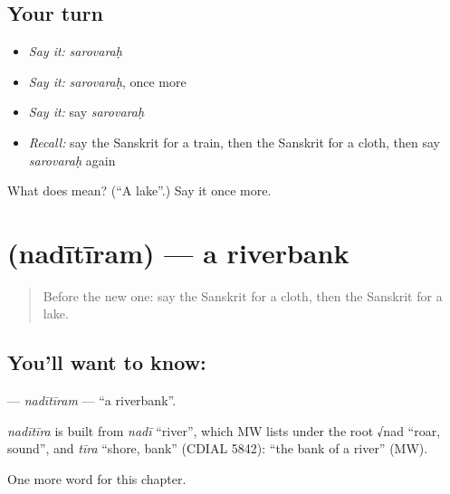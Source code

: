 \subsection*{Your turn}
\begin{itemize}
\raggedright
  \item \emph{Say it:} \emph{sarovaraḥ}
  \item \emph{Say it:} \emph{sarovaraḥ}, once more
  \item \emph{Say it:} say \emph{sarovaraḥ}
  \item \emph{Recall:} say the Sanskrit for a train, then the Sanskrit for a cloth, then say \emph{sarovaraḥ} again
\end{itemize}

\begin{tcolorbox}[breakable,colback=teal!4,colframe=teal!35!black,title={Before you move on}]
What does  mean? (\textquotedblleft{}A lake\textquotedblright{}.) Say it once more.
\end{tcolorbox}
\section[\texorpdfstring{\sk{नदीतीरम्} (nadītīram)}{नदीतीरम् (nadītīram)}]{ (nadītīram) — a riverbank}

\label{lesson:SA-C124-naditiram}



\begin{quote}
Before the new one: say the Sanskrit for a cloth, then the Sanskrit for a lake.
\end{quote}

\subsection*{You'll want to know: }
\textbf{} — \emph{nadītīram} — \textquotedblleft{}a riverbank\textquotedblright{}.

\begin{cousinweb}
\emph{nadītīra} is built from \emph{nadī} \textquotedblleft{}river\textquotedblright{}, which MW lists under the root √nad \textquotedblleft{}roar, sound\textquotedblright{}, and \emph{tīra} \textquotedblleft{}shore, bank\textquotedblright{} (CDIAL 5842): \textquotedblleft{}the bank of a river\textquotedblright{} (MW).
\end{cousinweb}

\begin{grammarlens}[title={What you've built}]
One more word for this chapter.
\end{grammarlens}

